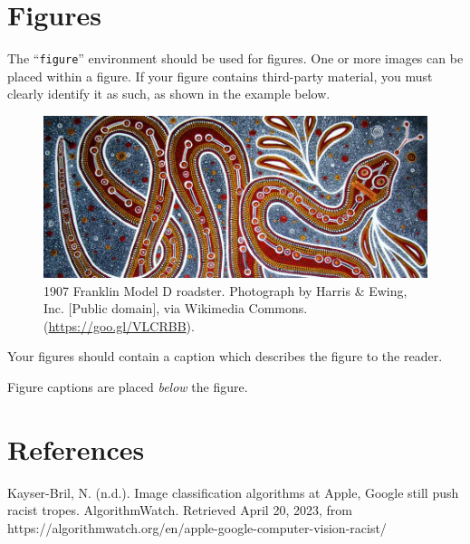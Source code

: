 \documentclass[manuscript,screen,review]{acmart}
\begin{document}
{\section{Figures}

The ``\verb|figure|'' environment should be used for figures. One or
more images can be placed within a figure. If your figure contains
third-party material, you must clearly identify it as such, as shown
in the example below.
\begin{figure}[h]
  \centering
  \includegraphics[width=\linewidth]{snake.jpg}
  \caption{1907 Franklin Model D roadster. Photograph by Harris \&
    Ewing, Inc. [Public domain], via Wikimedia
    Commons. (\url{https://goo.gl/VLCRBB}).}
\end{figure}

Your figures should contain a caption which describes the figure to
the reader.

Figure captions are placed {\itshape below} the figure.
}

\section{References}
Kayser-Bril, N. (n.d.). Image classification algorithms at Apple, Google still push racist tropes. AlgorithmWatch. Retrieved April 20, 2023, from https://algorithmwatch.org/en/apple-google-computer-vision-racist/ 
\end{document}
